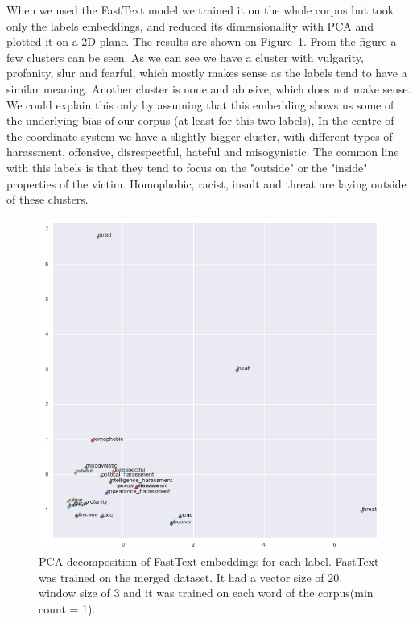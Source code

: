 \documentclass[fleqn,moreauthors,10pt]{ds_report}
\begin{document}
When we used the FastText model we trained it on the whole corpus but took only the labels embeddings, and reduced its dimensionality with PCA and plotted it on a 2D plane. The results are shown on Figure~\ref{fig:fasttextpca}. From the figure a few clusters can be seen. As we can see we have a cluster with vulgarity, profanity, slur and fearful, which mostly makes sense as the labels tend to have a similar meaning. Another cluster is none and abusive, which does not make sense. We could explain this only by assuming that this embedding shows us some of the underlying bias of our corpus (at least for this two labels), In the centre of the coordinate system we have a slightly bigger cluster, with different types of harassment, offensive, disrespectful, hateful and misogynistic. The common line with this labels is that they tend to focus on the "outside" or the "inside" properties of the victim. Homophobic, racist, insult and threat are laying outside of these clusters.

\begin{figure}
    \centering
    \includegraphics[width=0.7\columnwidth]{fig/fastText_PCA.png}
    \caption{PCA decomposition of FastText embeddings for each label. FastText was trained on the merged dataset. It had a vector size of 20, window size of 3 and it was trained on each word of the corpus(min count = 1).}
    \label{fig:fasttextpca}
\end{figure}
\end{document}
